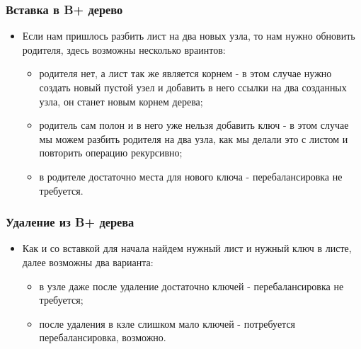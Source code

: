 \begin{frame}
\frametitle{Вставка в B+ дерево}
\begin{itemize}
  \item Если нам пришлось разбить лист на два новых узла, то нам нужно
  обновить родителя, здесь возможны несколько враинтов:
  \begin{itemize}
    \item родителя нет, а лист так же является корнем - в этом случае нужно
    создать новый пустой узел и добавить в него ссылки на два созданных узла,
    он станет новым корнем дерева;
    \item родитель сам полон и в него уже нельзя добавить ключ - в этом
    случае мы можем разбить родителя на два узла, как мы делали это с листом
    и повторить операцию рекурсивно;
    \item в родителе достаточно места для нового ключа - перебалансировка не
    требуется.
  \end{itemize}
\end{itemize}
\end{frame}

\begin{frame}
\frametitle{Удаление из B+ дерева}
\begin{itemize}
  \item Как и со вставкой для начала найдем нужный лист и нужный ключ в
  листе, далее возможны два варианта:
  \begin{itemize}
    \item в узле даже после удаление достаточно ключей - перебалансировка
    не требуется;
    \item после удаления в кзле слишком мало ключей - потребуется
    перебалансировка, возможно.
  \end{itemize}
\end{itemize}
\end{frame}

